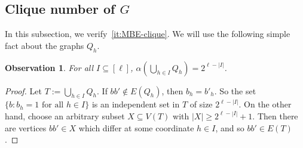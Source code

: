 \documentclass[11pt, a4paper]{article}
\newtheorem{observation}[theorem]{Observation}
\theoremstyle{definition}
\newcommand{\sS}{\mathsf{S}}
\begin{document}






\subsection{Clique number of $G$}
In this subsection, we verify~\ref{it:MBE-clique}. We will use the following simple fact about the graphs $Q_h$.
\begin{observation}\label{obs-indset}
	For all $I \subseteq [\ell]$, $\alpha\left(\bigcup_{h \in I}Q_h\right)=2^{\ell-|I|}$. %
\end{observation}

\begin{proof}
	Let $T := \bigcup_{h \in I}Q_h$.
	If $bb' \notin E(Q_h)$, then $b_h= b'_h$. So the set $\{ b : b_h = 1 \text{ for all }h \in I\}$ is an independent set in $T$ of size $2^{\ell-|I|}$.
	On the other hand, choose an arbitrary subset  $X \subseteq V(T)$ with $|X| \geq 2^{\ell-|I|}+1$.
	Then there are vertices $bb' \in X$ which differ at some coordinate $h \in I$, and so $bb' \in E(T)$.
\end{proof}


\end{document}
